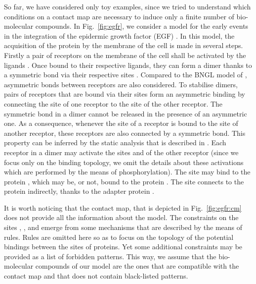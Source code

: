 \documentclass{entcs}
\begin{document}
So far, we have considered only toy examples, since we tried to understand which conditions on a contact map are necessary to induce only a finite number of bio-molecular compounds. In Fig.~\ref{fig:egfr}, we consider
a model for the early events in the integration of the epidermic growth factor (EGF) \cite{Blinov-2006-ANM}. In this model, the acquisition of the protein  by the membrane of the cell is made in several steps.
Firstly a pair of receptors  on the membrane of the cell shall be activated by the ligands . Once bound to their respective ligands, they can form a dimer thanks to a symmetric bond via their respective sites
. Compared to the BNGL model of \cite{Blinov-2006-ANM}, asymmetric bonds between receptors are also considered. To stabilise dimers, pairs of receptors that are bound via their sites  form an asymmetric binding by connecting the site  of one receptor to the site  of the other receptor. The symmetric bond in a dimer cannot be released in the presence of an asymmetric one. As a consequence, whenever the site  of a receptor is bound to the site  of another receptor, these receptors are also connected by a symmetric bond. This property can be inferred
by the static analysis that is described in \cite{SASB2016,KaSa}.
Each receptor in a dimer may activate the sites  and  of the other receptor (since we focus only on the binding topology, we omit the details about these activations which are performed by the means of phosphorylation). The site  may bind to the protein , which may be, or not, bound to the protein
. The site  connects to the protein  indirectly, thanks to the adapter protein .

It is worth noticing that the contact map, that is depicted in Fig.~\ref{fig:egfr:cm} does not provide all the information about the model.
The constraints on the sites , , and  emerge from some mechanisms that are described by the means of rules.
Rules are omitted here so as to focus on the topology of the potential bindings between the sites of proteins. Yet some additional constraints may be provided as a list of forbidden patterns. This way, we assume that the bio-molecular compounds of our model are the ones that are compatible with the contact map and that does not contain black-listed patterns.
\end{document}
